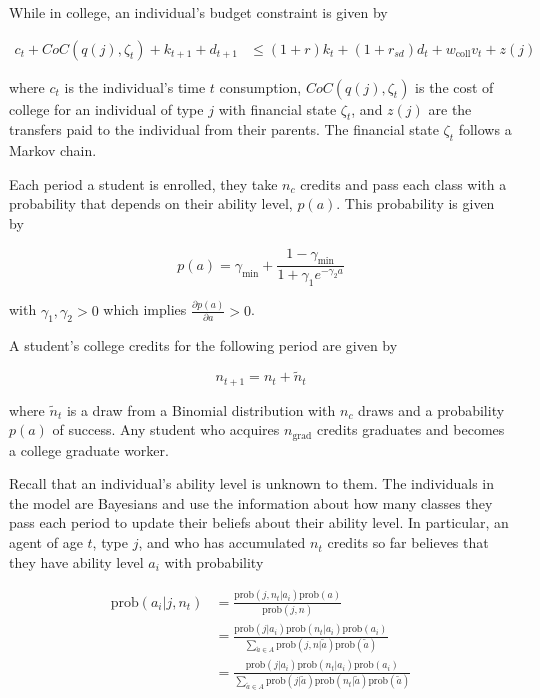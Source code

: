   While in college, an individual's budget constraint is given by

  \begin{align*}
      c_t + CoC(q(j), \zeta_t) + k_{t+1} + d_{t+1} &\leq
      (1 + r) k_t + (1 + r_{sd}) d_t + w_{\text{coll}} v_t + z(j)
  \end{align*}

  where $c_t$ is the individual's time $t$ consumption, $CoC(q(j), \zeta_t)$ is the cost of college
  for an individual of type $j$ with financial state $\zeta_t$, and $z(j)$ are the transfers paid to
  the individual from their parents. The financial state $\zeta_t$ follows a Markov chain.

  Each period a student is enrolled, they take $n_c$ credits and pass each class with a probability
  that depends on their ability level, $p(a)$. This probability is given by

  $$p(a) = \gamma_{\text{min}} + \frac{1 - \gamma_{\text{min}}}{1 + \gamma_1 e^{-\gamma_2 a}}$$

  with $\gamma_1, \gamma_2 > 0$ which implies $\frac{\partial p(a)}{\partial a} > 0$.

  A student's college credits for the following period are given by

  $$n_{t+1} = n_t + \tilde{n}_t$$

  where $\tilde{n}_t$ is a draw from a Binomial distribution with $n_c$ draws and a probability
  $p(a)$ of success. Any student who acquires $n_{\text{grad}}$ credits graduates and becomes a
  college graduate worker.

  Recall that an individual's ability level is unknown to them. The individuals in the model are
  Bayesians and use the information about how many classes they pass each period to update their
  beliefs about their ability level. In particular, an agent of age $t$, type $j$, and who has
  accumulated $n_t$ credits so far believes that they have ability level $a_i$ with probability

  \begin{align*}
    \text{prob}(a_i | j, n_t) &= \frac{\text{prob}(j, n_t | a_i) \text{prob}(a)}{\text{prob}(j, n)} \\
    &= \frac{\text{prob}(j | a_i) \text{prob}(n_t | a_i) \text{prob}(a_i)}{\sum_{\tilde{a} \in A} \text{prob}(j, n | \tilde{a}) \text{prob}(\tilde{a})} \\
    &= \frac{\text{prob}(j | a_i) \text{prob}(n_t | a_i) \text{prob}(a_i)}{\sum_{\tilde{a} \in A} \text{prob}(j | \tilde{a}) \text{prob}(n_t | \tilde{a}) \text{prob}(\tilde{a})} \\
  \end{align*}

